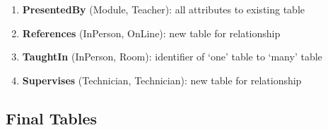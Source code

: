 \documentclass[11pt, english]{article}
\begin{document}
%
	\begin{enumerate}
	\setlength\itemsep{0cm}
		\item \textbf{PresentedBy} (Module, Teacher): all attributes to existing table
		\item \textbf{References} (InPerson, OnLine): new table for relationship
		\item \textbf{TaughtIn} (InPerson, Room): identifier of `one' table to `many' table
		\item \textbf{Supervises} (Technician, Technician): new table for relationship
	\end{enumerate}

	\subsection{Final Tables}
\end{document}
